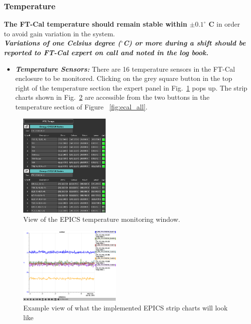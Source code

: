 \documentclass[11.5pt]{article}
\begin{document}
\subsubsection{Temperature}\label{sec:ft-t}
\textbf{The FT-Cal temperature should remain stable within $\pm 0.1^{\circ}$ C} in order to avoid gain variation in the system.\\
\textbf{\textit{Variations of one Celsius degree ($^{\circ}$C) or more during a shift should be reported to FT-Cal expert on call and noted in the log book.}}
\begin{itemize}
\item \textit{\textbf{Temperature Sensors:}} There are 16 temperature sensors in the FT-Cal enclosure to be monitored. Clicking on the grey square button in the top right of the temperature section the expert panel in  Fig.~\ref{fig:temp} pops up. The strip charts shown in Fig.~\ref{fig:striptemp} are accessible from the two buttons in the temperature section of Figure ~\ref{fig:ecal_all}.
\end{itemize}
\begin{figure}[ht]
\center
\includegraphics[width=0.4\textwidth]{pics/PT100_3.png}
\caption{ \label{fig:temp} View of the EPICS temperature monitoring window.}
\end{figure}

\begin{figure}[ht]
\center
\includegraphics[width=0.45\textwidth]{pics/Strip_Chart_T_Crystal.png}
\caption{ \label{fig:striptemp} Example view of what the implemented EPICS strip charts will look like}
\end{figure}
\end{document}
